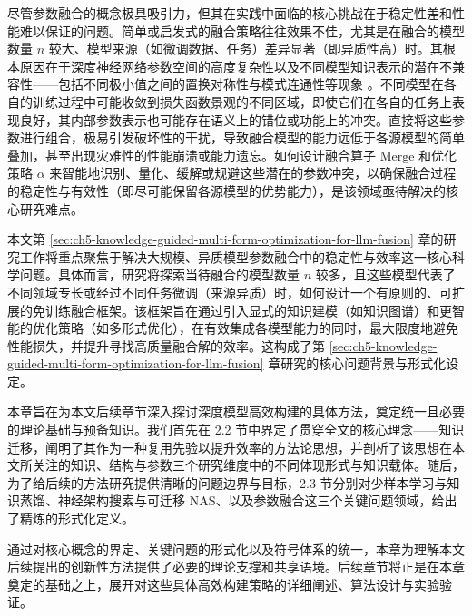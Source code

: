 \documentclass[../main.tex]{subfiles}
\begin{document}
尽管参数融合的概念极具吸引力，但其在实践中面临的核心挑战在于稳定性差和性能难以保证的问题。简单或启发式的融合策略往往效果不佳，尤其是在融合的模型数量 $n$ 较大、模型来源（如微调数据、任务）差异显著（即异质性高）时。其根本原因在于深度神经网络参数空间的高度复杂性以及不同模型知识表示的潜在不兼容性——包括不同极小值之间的置换对称性与模式连通性等现象 \cite{gitrebasin_ainsworth_2023,losssurfacesmode_garipov_2018}。不同模型在各自的训练过程中可能收敛到损失函数景观的不同区域，即使它们在各自的任务上表现良好，其内部参数表示也可能存在语义上的错位或功能上的冲突。直接将这些参数进行组合，极易引发破坏性的干扰，导致融合模型的能力远低于各源模型的简单叠加，甚至出现灾难性的性能崩溃或能力遗忘。如何设计融合算子 $\text{Merge}$ 和优化策略 $\alpha$ 来智能地识别、量化、缓解或规避这些潜在的参数冲突，以确保融合过程的稳定性与有效性（即尽可能保留各源模型的优势能力），是该领域亟待解决的核心研究难点。

本文第 \ref{sec:ch5-knowledge-guided-multi-form-optimization-for-llm-fusion} 章的研究工作将重点聚焦于解决大规模、异质模型参数融合中的稳定性与效率这一核心科学问题。具体而言，研究将探索当待融合的模型数量 $n$ 较多，且这些模型代表了不同领域专长或经过不同任务微调（来源异质）时，如何设计一个有原则的、可扩展的免训练融合框架。该框架旨在通过引入显式的知识建模（如知识图谱）和更智能的优化策略（如多形式优化），在有效集成各模型能力的同时，最大限度地避免性能损失，并提升寻找高质量融合解的效率。这构成了第 \ref{sec:ch5-knowledge-guided-multi-form-optimization-for-llm-fusion} 章研究的核心问题背景与形式化设定。

\label{sec:ch2-4-chapter-summary}

本章旨在为本文后续章节深入探讨深度模型高效构建的具体方法，奠定统一且必要的理论基础与预备知识。我们首先在 2.2 节中界定了贯穿全文的核心理念——知识迁移，阐明了其作为一种复用先验以提升效率的方法论思想，并剖析了该思想在本文所关注的知识、结构与参数三个研究维度中的不同体现形式与知识载体。随后，为了给后续的方法研究提供清晰的问题边界与目标，2.3 节分别对少样本学习与知识蒸馏、神经架构搜索与可迁移 NAS、以及参数融合这三个关键问题领域，给出了精炼的形式化定义。

通过对核心概念的界定、关键问题的形式化以及符号体系的统一，本章为理解本文后续提出的创新性方法提供了必要的理论支撑和共享语境。后续章节将正是在本章奠定的基础之上，展开对这些具体高效构建策略的详细阐述、算法设计与实验验证。
\end{document}
